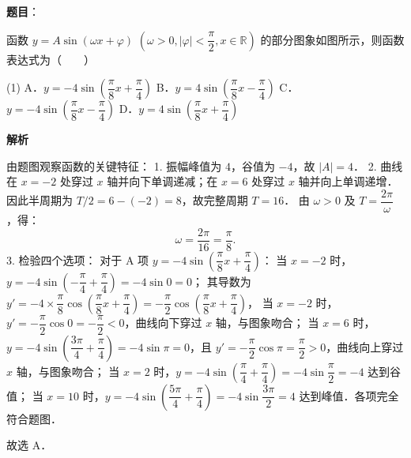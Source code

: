 \begin{answer}

\textbf{题目}：

函数 $y = A\sin(\omega x + \varphi)$ $\left(\omega > 0, |\varphi| < \dfrac{\pi}{2}, x \in \mathbb{R}\right)$ 的部分图象如图所示，则函数表达式为\mbox{（　　）}
\nopagebreak[4]
\begin{center}\end{center}
\nopagebreak[4]
\begin{gkopts}(1)
\task A．$y = -4\sin\left(\dfrac{\pi}{8}x + \dfrac{\pi}{4}\right)$
\task B．$y = 4\sin\left(\dfrac{\pi}{8}x - \dfrac{\pi}{4}\right)$
\task C．$y = -4\sin\left(\dfrac{\pi}{8}x - \dfrac{\pi}{4}\right)$
\task D．$y = 4\sin\left(\dfrac{\pi}{8}x + \dfrac{\pi}{4}\right)$
\end{gkopts}

\textbf{解析}

由题图观察函数的关键特征：
1. 振幅峰值为 $4$，谷值为 $-4$，故 $|A| = 4$．
2. 曲线在 $x = -2$ 处穿过 $x$ 轴并向下单调递减；在 $x = 6$ 处穿过 $x$ 轴并向上单调递增．
因此半周期为 $T/2 = 6 - (-2) = 8$，故完整周期 $T = 16$．
由 $\omega > 0$ 及 $T = \dfrac{2\pi}{\omega}$，得：
\nopagebreak[4]
\[
\omega = \dfrac{2\pi}{16} = \dfrac{\pi}{8}.
\]
3. 检验四个选项：
对于 A 项 $y = -4\sin\left(\dfrac{\pi}{8}x + \dfrac{\pi}{4}\right)$：
当 $x = -2$ 时，$y = -4\sin\left(-\dfrac{\pi}{4} + \dfrac{\pi}{4}\right) = -4\sin 0 = 0$；
其导数为 $y' = -4 \times \dfrac{\pi}{8} \cos\left(\dfrac{\pi}{8}x + \dfrac{\pi}{4}\right) = -\dfrac{\pi}{2} \cos\left(\dfrac{\pi}{8}x + \dfrac{\pi}{4}\right)$，
当 $x = -2$ 时，$y' = -\dfrac{\pi}{2}\cos 0 = -\dfrac{\pi}{2} < 0$，曲线向下穿过 $x$ 轴，与图象吻合；
当 $x = 6$ 时，$y = -4\sin\left(\dfrac{3\pi}{4} + \dfrac{\pi}{4}\right) = -4\sin\pi = 0$，且 $y' = -\dfrac{\pi}{2}\cos\pi = \dfrac{\pi}{2} > 0$，曲线向上穿过 $x$ 轴，与图象吻合；
当 $x = 2$ 时，$y = -4\sin\left(\dfrac{\pi}{4} + \dfrac{\pi}{4}\right) = -4\sin\dfrac{\pi}{2} = -4$ 达到谷值；
当 $x = 10$ 时，$y = -4\sin\left(\dfrac{5\pi}{4} + \dfrac{\pi}{4}\right) = -4\sin\dfrac{3\pi}{2} = 4$ 达到峰值．各项完全符合题图．

故选 A．


\end{answer}
